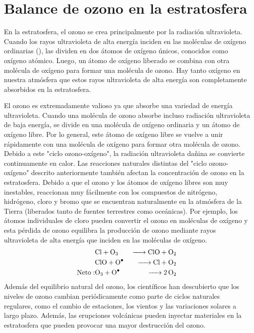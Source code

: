 \section{Balance de ozono en la estratosfera}

En la estratosfera, el ozono se crea principalmente por la radiación ultravioleta. Cuando los rayos ultravioleta de alta energía inciden en las moléculas de oxígeno ordinarias (), las dividen en dos átomos de oxígeno únicos, conocidos como oxígeno atómico.
 Luego, un átomo de oxígeno liberado se combina con otra molécula de oxígeno para formar una molécula de ozono. Hay tanto oxígeno en nuestra atmósfera que estos rayos ultravioleta de alta energía son completamente absorbidos en la estratosfera.

El ozono es extremadamente valioso ya que absorbe una variedad de energía ultravioleta. Cuando una molécula de ozono absorbe incluso radiación ultravioleta de baja energía, se divide en una molécula de oxígeno ordinaria y un átomo de oxígeno libre. Por lo general, este átomo de oxígeno libre se vuelve a unir rápidamente con una molécula de oxígeno para formar otra molécula de ozono. Debido a este "ciclo ozono-oxígeno", la  radiación ultravioleta dañina se convierte continuamente en calor.
Las reacciones naturales distintas del "ciclo ozono-oxígeno" descrito anteriormente también afectan la concentración de ozono en la estratosfera. Debido a que el ozono y los átomos de oxígeno libres son muy inestables, reaccionan muy fácilmente con los compuestos de nitrógeno, hidrógeno, cloro y bromo que se encuentran naturalmente en la atmósfera de la Tierra (liberados tanto de fuentes terrestres como oceánicas). Por ejemplo, los átomos individuales de cloro pueden convertir el ozono en moléculas de oxígeno y esta pérdida de ozono equilibra la producción de ozono mediante rayos ultravioleta de alta energía que inciden en las moléculas de oxígeno.
\begin{eqnarray*}
 &\ce{Cl + O3 & -> ClO + O2  \\
 &ClO +  O^.  & -> Cl + O2 }\\ 
  \mathrm{Neto: } &\ce{O3 + O^.  &  -> 2O2}
\end{eqnarray*}
Además del equilibrio natural del ozono, los científicos han descubierto que los niveles de ozono cambian periódicamente como parte de ciclos naturales regulares, como el cambio de estaciones, los vientos y las variaciones solares a largo plazo. Además, las erupciones volcánicas pueden inyectar materiales en la estratosfera que pueden provocar una mayor destrucción del ozono.

